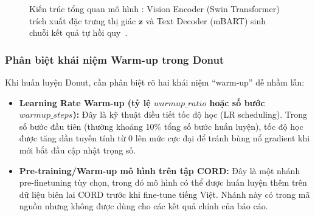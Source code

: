 \begin{figure}[htbp]
{
  }
  \caption{Kiến trúc tổng quan mô hình : Vision Encoder (Swin Transformer) trích xuất đặc trưng thị giác $\mathbf{z}$ và Text Decoder (mBART) sinh chuỗi kết quả tự hồi quy~\cite{kim2022donut}.}
  \label{fig:donut_arch}
\end{figure}

\subsubsection{Phân biệt khái niệm Warm-up trong Donut}
\label{subsubsec:donut_warmup}

Khi huấn luyện Donut, cần phân biệt rõ hai khái niệm ``warm-up'' dễ nhầm lẫn:
\begin{itemize}
  \item \textbf{Learning Rate Warm-up (tỷ lệ $warmup\_ratio$ hoặc số bước $warmup\_steps$):} Đây là kỹ thuật điều tiết tốc độ học (LR scheduling). Trong số bước đầu tiên (thường khoảng 10\% tổng số bước huấn luyện), tốc độ học được tăng dần tuyến tính từ 0 lên mức cực đại để tránh bùng nổ gradient khi mới bắt đầu cập nhật trọng số.
  \item \textbf{Pre-training/Warm-up mô hình trên tập CORD:} Đây là một nhánh pre-finetuning tùy chọn, trong đó mô hình có thể được huấn luyện thêm trên dữ liệu biên lai CORD trước khi fine-tune tiếng Việt. Nhánh này có trong mã nguồn nhưng không được dùng cho các kết quả chính của báo cáo.
\end{itemize}

